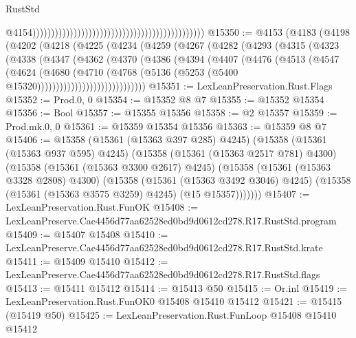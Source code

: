 \begin{lexlean}{RustStd}
\begin{coremodule}
                                                                                                @4154))))))))))))))))))))))))))))))))))))))))))))))
@15350 := @4153
    (@4183
      (@4198
        (@4202
          (@4218
            (@4225
              (@4234
                (@4259
                  (@4267
                    (@4282
                      (@4293
                        (@4315
                          (@4323
                            (@4338
                              (@4347
                                (@4362
                                  (@4370
                                    (@4386
                                      (@4394
                                        (@4407
                                          (@4476
                                            (@4513
                                              (@4547
                                                (@4624
                                                  (@4680
                                                    (@4710
                                                      (@4768
                                                        (@5136
                                                          (@5253
                                                            (@5400
                                                              @15320)))))))))))))))))))))))))))))
@15351 := LexLeanPreservation.Rust.Flags
@15352 := Prod.{0, 0}
@15354 := @15352 @8 @7
@15355 := @15352 @15354
@15356 := Bool
@15357 := @15355 @15356
@15358 := @2 @15357
@15359 := Prod.mk.{0, 0}
@15361 := @15359 @15354 @15356
@15363 := @15359 @8 @7
@15406 := @15358
    (@15361 (@15363 @397 @285) @4245)
    (@15358
      (@15361 (@15363 @937 @595) @4245)
      (@15358
        (@15361 (@15363 @2517 @781) @4300)
        (@15358
          (@15361 (@15363 @3300 @2617) @4245)
          (@15358
            (@15361 (@15363 @3328 @2808) @4300)
            (@15358
              (@15361 (@15363 @3492 @3046) @4245)
              (@15358 (@15361 (@15363 @3575 @3259) @4245) (@15 @15357)))))))
@15407 := LexLeanPreservation.Rust.FunOK
@15408 := LexLeanPreserve.Cae4456d77aa62528ed0bd9d0612cd278.R17.RustStd.program
@15409 := @15407 @15408
@15410 := LexLeanPreserve.Cae4456d77aa62528ed0bd9d0612cd278.R17.RustStd.krate
@15411 := @15409 @15410
@15412 := LexLeanPreserve.Cae4456d77aa62528ed0bd9d0612cd278.R17.RustStd.flags
@15413 := @15411 @15412
@15414 := @15413 @50
@15415 := Or.inl
@15419 := LexLeanPreservation.Rust.FunOK0 @15408 @15410 @15412
@15421 := @15415 (@15419 @50)
@15425 := LexLeanPreservation.Rust.FunLoop @15408 @15410 @15412

\end{coremodule}
\end{lexlean}
